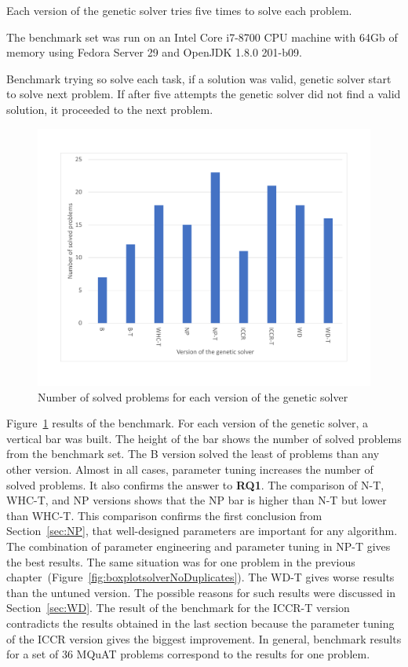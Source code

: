 Each version of the genetic solver tries five times to solve each problem.

The benchmark set was run on an Intel Core i7-8700 CPU machine with 64Gb of memory using Fedora Server 29 and OpenJDK 1.8.0 201-b09.

Benchmark trying so solve each task, if a solution was valid, genetic solver start to solve next problem. If after five attempts the genetic solver did not find a valid solution, it proceeded to the next problem.

\begin{figure}
	\centering
	\includegraphics[width=\textwidth]{images/EvaluationNumberOfSolvedProblems.pdf}
	\caption[Number of problems for each version of the genetic solver]{Number of solved problems for each version of the genetic solver}
	\label{fig:EvaluationNumberOfSolvedProblems}
\end{figure}

Figure~\ref{fig:EvaluationNumberOfSolvedProblems} results of the benchmark. For each version of the genetic solver, a vertical bar was built. The height of the bar shows the number of solved problems from the benchmark set. The B version solved the least of problems than any other version. Almost in all cases, parameter tuning increases the number of solved problems. It also confirms the answer to \textbf{RQ1}. The comparison of N-T, WHC-T, and NP versions shows that the NP bar is higher than N-T but lower than WHC-T. This comparison confirms the first conclusion from Section~\ref{sec:NP}, that well-designed parameters are important for any algorithm. The combination of parameter engineering and parameter tuning in NP-T gives the best results. The same situation was for one problem in the previous chapter~(Figure~\ref{fig:boxplotsolverNoDuplicates}). The WD-T gives worse results than the untuned version. The possible reasons for such results were discussed in Section~\ref{sec:WD}. The result of the benchmark for the ICCR-T version contradicts the results obtained in the last section because the parameter tuning of the ICCR version gives the biggest improvement. In general, benchmark results for a set of 36 MQuAT problems correspond to the results for one problem.

